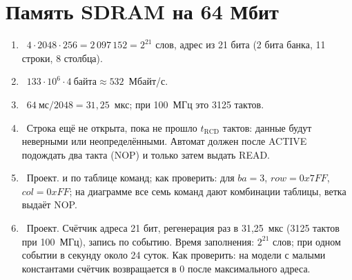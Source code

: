 \section*{Память SDRAM на 64 Мбит}
\begin{enumerate}
  \item {}~$4\cdot 2048\cdot 256 = 2\,097\,152=2^{21}$ слов, адрес из 21 бита (2 бита банка, 11 строки, 8 столбца).
  \item {}~$133\cdot 10^6\cdot 4~\text{байта}\approx 532$~Мбайт/с.
  \item {}~$64~\text{мс}/2048=31{,}25$~мкс; при 100~МГц это 3125 тактов.
  \item {}~Строка ещё не открыта, пока не прошло $t_\text{RCD}$ тактов: данные будут неверными или неопределёнными. Автомат должен после ACTIVE подождать два такта (NOP) и только затем выдать READ.
  \item {}~Проект.  и  по таблице команд; как проверить: для  $ba=3$, $row=0x7FF$, $col=0xFF$; на диаграмме все семь команд дают комбинации таблицы, ветка  выдаёт NOP.
  \item {}~Проект. Счётчик адреса 21 бит, регенерация раз в 31,25~мкс (3125 тактов при 100~МГц), запись по событию. Время заполнения: $2^{21}$ слов; при одном событии в секунду около 24 суток. Как проверить: на модели с малыми константами счётчик возвращается в 0 после максимального адреса.
\end{enumerate}

